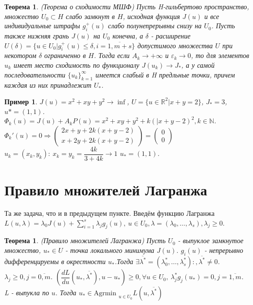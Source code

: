 \documentclass[9pt, a4paper]{extarticle}
\newtheorem*{theorem*}{Теорема}
\newtheorem*{theorem}{Теорема}
\newtheorem*{sample}{Пример}
\begin{document}
	\begin{theorem*}
		(Теорема о сходимости МШФ)\newline
		Пусть H-гильбертово пространство, множество $U_0 \subset H$ слабо замкнут в $H$, исходная функция $J(u)$ и все индивидуальные штрафы $g_i^+(u)$ слабо полунепрерывны снизу на $U_0$. Пусть также нижняя грань $J(u)$ на $U_0$ конечна, а $\delta$ - расширение $U(\delta) = \{u\in U_0 \vert g_i^+(u) \leq \delta , i =\overline{1, m+s}\}$ допустимого множества  $U$ при некотором $\delta$ ограниченно в $H$. Тогда если $A_k \to +\infty$ и $ \varepsilon_k \to 0$, то для элементов $u_k$ имеет место сходимость по функционалу $J(u_k) \to J_*$, а у самой последовательности $\{u_k\}_{k=1}^\infty$ имеется слабый в H предльные точки, причем каждая из них принадлежит $U_*$. 
	\end{theorem*}
	\begin{sample}
		$J(u) = x^2 + xy + y^2  \to \inf$, $U = \{u \in \mathbb{R}^2 \vert x+y=2\}$, $J_* =3$, $u* = (1,1)$. \newline
		$\Phi_k(u) = J(u) + A_kP(u) = x^2 +xy+y^2 + k (|x+y-2)^2, k \in \mathbb{N}$. \newline
		$\Phi_k'(u) = 0 \Rightarrow \left(\begin{matrix}
			2x+y+2k(x+y-2)\\
			x+2y+2k(x+y-2)
		\end{matrix}\right) = \left(\begin{matrix}
		0\\ 0
		\end{matrix}\right)$\newline
		$u_k =(x_k, y_k): \ x_k= y_k= \dfrac{4k}{3+4k}\to 1$ $u_* = (1,1)$.
	\end{sample}
\section{Правило множителей Лагранжа}
 	Та же задача, что и в предыдущем пункте. \newline
 	Введём функцию Лагранжа $L(u, \lambda) = \lambda_0 J(u) + \sum\limits_{i=1}^s \lambda_j g_j(u), \ u \in U_0, \lambda = (\lambda_0, \dots, \lambda_s), \lambda_j \geq 0$. 
 	
	\begin{theorem}
		(Правило множителей Лагранжа)\newline
		Пусть $U_0$ - выпуклое замкнутое множество, $u_* \in U$ - точка локального минимума $J(u)$. $g_i(u)$ - непрерывно дифференцируемы в окрестности $u_*$.Тогда $\exists \overline{\lambda^*} = (\lambda_0^*, \dots, \lambda_s^*): ,  \overline{\lambda^*} \neq 0$. $\lambda_j \geq 0, j = \overline{0,m}$. $(\dfrac{dL}{du}(u_*,  \overline{\lambda^*}) , u - u_*) \geq 0, \forall u \in U_0, \ \lambda_j^*g_j(u_*) = 0, j = \overline{1, m}$. L - выпукла по $u$. Тогда $u_* \in \text{Agrmin }_{u \in U_0} L(u,  \overline{\lambda^*})$
	\end{theorem}
\end{document}
